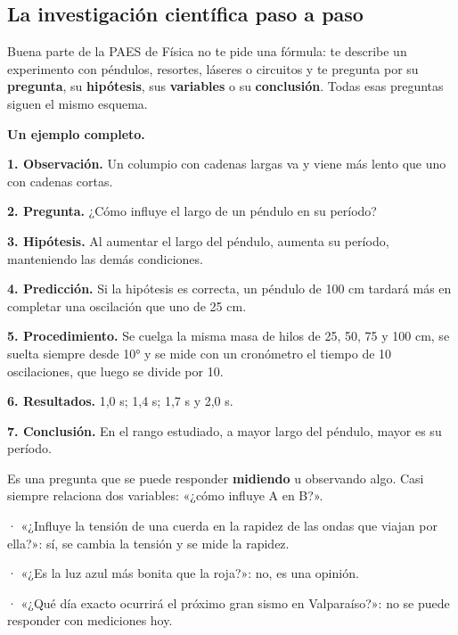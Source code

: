 \subsection{La investigación científica paso a paso}
Buena parte de la PAES de Física no te pide una fórmula: te describe un experimento con péndulos, resortes, láseres o circuitos y te pregunta por su \textbf{pregunta}, su \textbf{hipótesis}, sus \textbf{variables} o su \textbf{conclusión}. Todas esas preguntas siguen el mismo esquema.

  

\textbf{Un ejemplo completo.}

 

\textbf{1. Observación.} Un columpio con cadenas largas va y viene más lento que uno con cadenas cortas.

 

\textbf{2. Pregunta.} ¿Cómo influye el largo de un péndulo en su período?

 

\textbf{3. Hipótesis.} Al aumentar el largo del péndulo, aumenta su período, manteniendo las demás condiciones.

 

\textbf{4. Predicción.} Si la hipótesis es correcta, un péndulo de 100 cm tardará más en completar una oscilación que uno de 25 cm.

 

\textbf{5. Procedimiento.} Se cuelga la misma masa de hilos de 25, 50, 75 y 100 cm, se suelta siempre desde 10° y se mide con un cronómetro el tiempo de 10 oscilaciones, que luego se divide por 10.

 

\textbf{6. Resultados.} 1,0 s; 1,4 s; 1,7 s y 2,0 s.

 

\textbf{7. Conclusión.} En el rango estudiado, a mayor largo del péndulo, mayor es su período.

  
\begin{clave} Es una pregunta que se puede responder \textbf{midiendo} u observando algo. Casi siempre relaciona dos variables: «¿cómo influye A en B?».\end{clave}
 
\begin{clave}[{¿Investigable o no?}] · «¿Influye la tensión de una cuerda en la rapidez de las ondas que viajan por ella?»: sí, se cambia la tensión y se mide la rapidez.\par · «¿Es la luz azul más bonita que la roja?»: no, es una opinión.\par · «¿Qué día exacto ocurrirá el próximo gran sismo en Valparaíso?»: no se puede responder con mediciones hoy.\end{clave}
 
